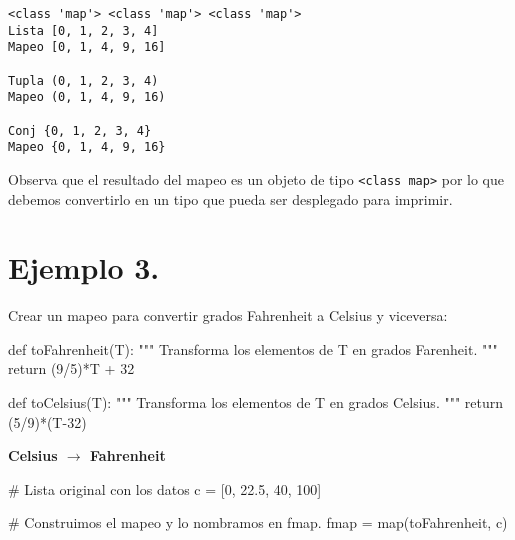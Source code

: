 \documentclass[
  letterpaper,
  DIV=11,
  numbers=noendperiod]{scrreprt}
\newenvironment{Shaded}{\begin{snugshade}}{\end{snugshade}}
\newcommand{\BuiltInTok}[1]{\textcolor[rgb]{0.00,0.23,0.31}{#1}}
\newcommand{\CommentTok}[1]{\textcolor[rgb]{0.37,0.37,0.37}{#1}}
\newcommand{\ControlFlowTok}[1]{\textcolor[rgb]{0.00,0.23,0.31}{#1}}
\newcommand{\DecValTok}[1]{\textcolor[rgb]{0.68,0.00,0.00}{#1}}
\newcommand{\FloatTok}[1]{\textcolor[rgb]{0.68,0.00,0.00}{#1}}
\newcommand{\KeywordTok}[1]{\textcolor[rgb]{0.00,0.23,0.31}{#1}}
\newcommand{\NormalTok}[1]{\textcolor[rgb]{0.00,0.23,0.31}{#1}}
\newcommand{\OperatorTok}[1]{\textcolor[rgb]{0.37,0.37,0.37}{#1}}
\begin{document}
\begin{verbatim}
<class 'map'> <class 'map'> <class 'map'>
Lista [0, 1, 2, 3, 4]
Mapeo [0, 1, 4, 9, 16]

Tupla (0, 1, 2, 3, 4)
Mapeo (0, 1, 4, 9, 16)

Conj {0, 1, 2, 3, 4}
Mapeo {0, 1, 4, 9, 16}
\end{verbatim}

Observa que el resultado del mapeo es un objeto de tipo
\texttt{\textless{}class\ \textquotesingle{}map\textquotesingle{}\textgreater{}}
por lo que debemos convertirlo en un tipo que pueda ser desplegado para
imprimir.

\section{\texorpdfstring{\textbf{Ejemplo
3.}}{Ejemplo 3.}}\label{ejemplo-3.-1}

Crear un mapeo para convertir grados Fahrenheit a Celsius y viceversa:

\begin{Shaded}
\begin{Highlighting}[]
\KeywordTok{def}\NormalTok{ toFahrenheit(T):}
    \CommentTok{"""}
\CommentTok{    Transforma los elementos de T en grados Farenheit.}
\CommentTok{    """}
    \ControlFlowTok{return}\NormalTok{ (}\DecValTok{9}\OperatorTok{/}\DecValTok{5}\NormalTok{)}\OperatorTok{*}\NormalTok{T }\OperatorTok{+} \DecValTok{32}

\KeywordTok{def}\NormalTok{ toCelsius(T):}
    \CommentTok{"""}
\CommentTok{    Transforma los elementos de T en grados Celsius.}
\CommentTok{    """}
    \ControlFlowTok{return}\NormalTok{ (}\DecValTok{5}\OperatorTok{/}\DecValTok{9}\NormalTok{)}\OperatorTok{*}\NormalTok{(T}\OperatorTok{{-}}\DecValTok{32}\NormalTok{)}
\end{Highlighting}
\end{Shaded}

\textbf{Celsius \(\to\) Fahrenheit}

\begin{Shaded}
\begin{Highlighting}[]
\CommentTok{\# Lista original con los datos}
\NormalTok{c }\OperatorTok{=}\NormalTok{ [}\DecValTok{0}\NormalTok{, }\FloatTok{22.5}\NormalTok{, }\DecValTok{40}\NormalTok{, }\DecValTok{100}\NormalTok{]}

\CommentTok{\# Construimos el mapeo y lo nombramos en \textasciigrave{}fmap\textasciigrave{}.}
\NormalTok{fmap }\OperatorTok{=} \BuiltInTok{map}\NormalTok{(toFahrenheit, c)}
\end{Highlighting}
\end{Shaded}
\end{document}
